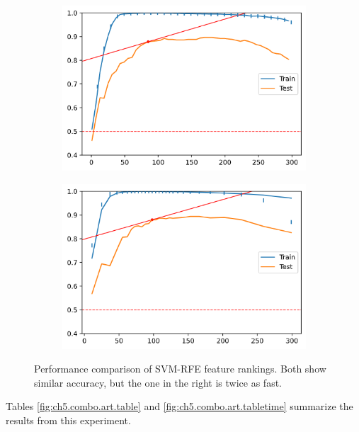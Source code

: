 \begin{figure}[H]
    \centering
    \begin{subfigure}[b]{0.4\linewidth}
        \includegraphics[width=\linewidth]{img/ch5/kernel/art_poly.png}
    \end{subfigure}
    \begin{subfigure}[b]{0.4\linewidth}
        \includegraphics[width=\linewidth]{img/ch5/combo/twice.png}
    \end{subfigure}
    \caption{Performance comparison of SVM-RFE feature rankings. Both show similar accuracy, but the one in the right is twice as fast.}
    \label{fig:ch5.combo.art.comp}
\end{figure}

Tables \ref{fig:ch5.combo.art.table} and \ref{fig:ch5.combo.art.tabletime} summarize the results from this experiment.

